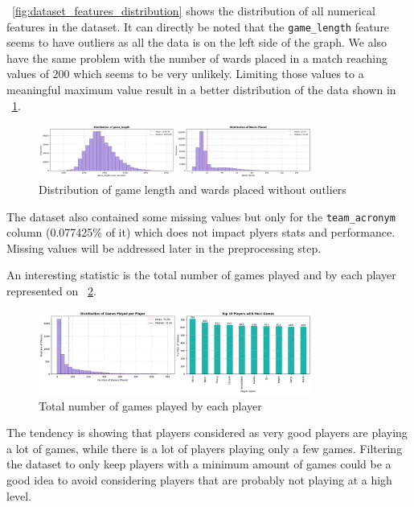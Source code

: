 \documentclass[12pt, a4paper]{article}
\begin{document}
\figurename~\ref{fig:dataset_features_distribution} shows the distribution of all numerical features in the dataset.
It can directly be noted that the \texttt{game\_length} feature seems to have outliers as all the data is on the left side of the graph.
We also have the same problem with the number of wards placed in a match reaching values of 200 which seems to be very unlikely.
Limiting those values to a meaningful maximum value result in a better distribution of the data shown in \figurename~\ref{fig:game_length_wards_distribution}.

\begin{figure}[!ht]
    \centering
    \includegraphics[width=0.8\textwidth]{figures/0_visualization_game_length_without_outliers.png}
    \caption{Distribution of game length and wards placed without outliers}
    \label{fig:game_length_wards_distribution}
\end{figure}

The dataset also contained some missing values but only for the \texttt{team\_acronym} column (0.077425\% of it) which does not impact plyers stats and performance.
Missing values will be addressed later in the preprocessing step.

An interesting statistic is the total number of games played and by each player represented on \figurename~\ref{fig:games_played}.

\begin{figure}[!ht]
    \centering
    \includegraphics[width=0.8\textwidth]{figures/0_visualization_games_played.png}
    \caption{Total number of games played by each player}
    \label{fig:games_played}
\end{figure}
The tendency is showing that players considered as very good players are playing a lot of games, while there is a lot of players playing only a few games.
Filtering the dataset to only keep players with a minimum amount of games could be a good idea to avoid considering players that are probably not playing at a high level.
\end{document}
